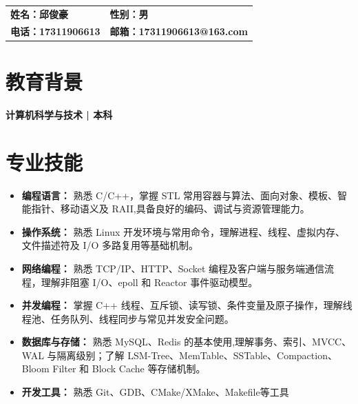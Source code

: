 \documentclass{resume}
\begin{document}

\begin{tabular}{@{}p{5.0cm}l@{}}
\textbf{姓名：邱俊豪} & \textbf{性别：男} \\
\textbf{电话：17311906613} & \textbf{邮箱：17311906613@163.com}
\end{tabular}\par
\vspace{0.7ex}

\section{教育背景}
\textbf{计算机科学与技术 | 本科}

\section{专业技能}
\begin{itemize}[parsep=0.05ex]
  \item \textbf{编程语言：} 熟悉 C/C++，掌握 STL 常用容器与算法、面向对象、模板、智能指针、移动语义及 RAII,具备良好的编码、调试与资源管理能力。
  \item \textbf{操作系统：} 熟悉 Linux 开发环境与常用命令，理解进程、线程、虚拟内存、文件描述符及 I/O 多路复用等基础机制。
  \item \textbf{网络编程：} 熟悉 TCP/IP、HTTP、Socket 编程及客户端与服务端通信流程，理解非阻塞 I/O、epoll 和 Reactor 事件驱动模型。
  \item \textbf{并发编程：} 掌握 C++ 线程、互斥锁、读写锁、条件变量及原子操作，理解线程池、任务队列、线程同步与常见并发安全问题。
  \item \textbf{数据库与存储：} 熟悉 MySQL、Redis 的基本使用,理解事务、索引、MVCC、WAL 与隔离级别；了解 LSM-Tree、MemTable、SSTable、Compaction、Bloom Filter 和 Block Cache 等存储机制。
  \item \textbf{开发工具：} 熟悉 Git、GDB、CMake/XMake、Makefile等工具
\end{itemize}
\end{document}
